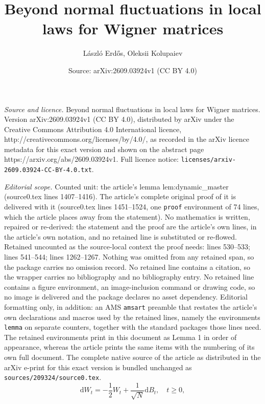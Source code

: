 \documentclass[10pt,a4paper]{amsart}
\title{Beyond normal fluctuations in local laws for Wigner matrices}
\author{L\'aszl\'o Erd\H{o}s, Oleksii Kolupaiev}
\date{Source: arXiv:2609.03924v1 (CC BY 4.0)}
\newcommand{\dif}{\mathrm{d}}
\begin{document}
\maketitle

\noindent\emph{Source and licence.} Beyond normal fluctuations in local laws for Wigner matrices. Version arXiv:2609.03924v1 (CC BY 4.0), distributed by arXiv under the Creative Commons Attribution 4.0 International licence, http://creativecommons.org/licenses/by/4.0/, as recorded in the arXiv licence metadata for this exact version and shown on the abstract page https://arxiv.org/abs/2609.03924v1. Full licence notice: \texttt{licenses/arxiv-2609.03924-CC-BY-4.0.txt}.\par\smallskip

\noindent\textit{Editorial scope.} Counted unit: the article's lemma lem:dynamic\_master (source0.tex lines 1407--1416). The article's complete original proof of it is delivered with it (source0.tex lines 1451--1524, one \texttt{proof} environment of 74 lines, which the article places away from the statement). No mathematics is written, repaired or re-derived: the statement and the proof are the article's own lines, in the article's own notation, and no retained line is substituted or re-flowed.  Retained uncounted as the source-local context the proof needs: lines 530--533; lines 541--544; lines 1262--1267.  Nothing was omitted from any retained span, so the package carries no omission record.  No retained line contains a citation, so the wrapper carries no bibliography and no bibliography entry.  No retained line contains a figure environment, an image-inclusion command or drawing code, so no image is delivered and the package declares no asset dependency.  Editorial formatting only, in addition: an AMS \texttt{amsart} preamble that restates the article's own declarations and macros used by the retained lines, namely the environments \texttt{lemma} on separate counters, together with the standard packages those lines need.  The retained environments print in this document as Lemma 1 in order of appearance, whereas the article prints the same items with the numbering of its own full document.  The complete native source of the article as distributed in the arXiv e-print for this exact version is bundled unchanged as \texttt{sources/209324/source0.tex}.
\begin{equation}
\dif W_t =-\frac{1}{2}W_t +\frac{1}{\sqrt{N}}\dif B_t,\quad t\ge 0,
\label{eq:OU_flow}
\end{equation}
\end{document}
